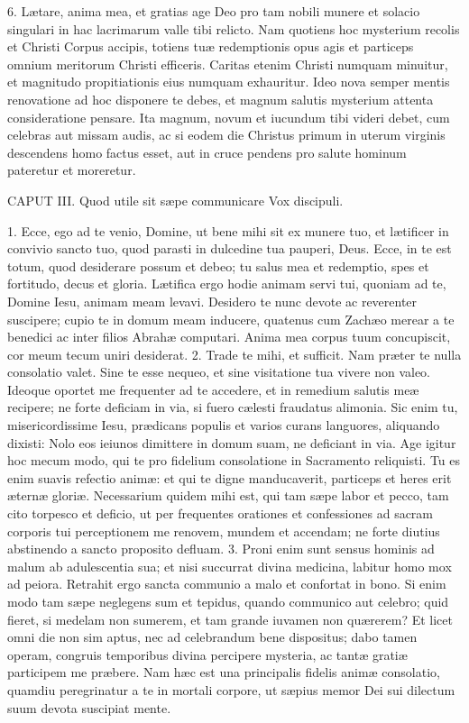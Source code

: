 \documentclass[twoside]{article}
\begin{document}
6. Lætare, anima mea, et gratias age Deo pro tam nobili munere et solacio singulari in hac lacrimarum valle tibi relicto. Nam quotiens hoc mysterium recolis et Christi Corpus accipis, totiens tuæ redemptionis opus agis et particeps omnium meritorum Christi efficeris. Caritas etenim Christi numquam minuitur, et magnitudo propitiationis eius numquam exhauritur. Ideo nova semper mentis renovatione ad hoc disponere te debes, et magnum salutis mysterium attenta consideratione pensare. Ita magnum, novum et iucundum tibi videri debet, cum celebras aut missam audis, ac si eodem die Christus primum in uterum virginis descendens homo factus esset, aut in cruce pendens pro salute hominum pateretur et moreretur.


CAPUT III.
Quod utile sit sæpe communicare
Vox discipuli.

1. Ecce, ego ad te venio, Domine, ut bene mihi sit ex munere tuo, et lætificer in convivio sancto tuo, quod parasti in dulcedine tua pauperi, Deus. Ecce, in te est totum, quod desiderare possum et debeo; tu salus mea et redemptio, spes et fortitudo, decus et gloria. Lætifica ergo hodie animam servi tui, quoniam ad te, Domine Iesu, animam meam levavi. Desidero te nunc devote ac reverenter suscipere; cupio te in domum meam inducere, quatenus cum Zachæo merear a te benedici ac inter filios Abrahæ computari. Anima mea corpus tuum concupiscit, cor meum tecum uniri desiderat.
2. Trade te mihi, et sufficit. Nam præter te nulla consolatio valet. Sine te esse nequeo, et sine visitatione tua vivere non valeo. Ideoque oportet me frequenter ad te accedere, et in remedium salutis meæ recipere; ne forte deficiam in via, si fuero cælesti fraudatus alimonia. Sic enim tu, misericordissime Iesu, prædicans populis et varios curans languores, aliquando dixisti: Nolo eos ieiunos dimittere in domum suam, ne deficiant in via. Age igitur hoc mecum modo, qui te pro fidelium consolatione in Sacramento reliquisti. Tu es enim suavis refectio animæ: et qui te digne manducaverit, particeps et heres erit æternæ gloriæ. Necessarium quidem mihi est, qui tam sæpe labor et pecco, tam cito torpesco et deficio, ut per frequentes orationes et confessiones ad sacram corporis tui perceptionem me renovem, mundem et accendam; ne forte diutius abstinendo a sancto proposito defluam.
3. Proni enim sunt sensus hominis ad malum ab adulescentia sua; et nisi succurrat divina medicina, labitur homo mox ad peiora. Retrahit ergo sancta communio a malo et confortat in bono. Si enim modo tam sæpe neglegens sum et tepidus, quando communico aut celebro; quid fieret, si medelam non sumerem, et tam grande iuvamen non quærerem? Et licet omni die non sim aptus, nec ad celebrandum bene dispositus; dabo tamen operam, congruis temporibus divina percipere mysteria, ac tantæ gratiæ participem me præbere. Nam hæc est una principalis fidelis animæ consolatio, quamdiu peregrinatur a te in mortali corpore, ut sæpius memor Dei sui dilectum suum devota suscipiat mente.
\end{document}
